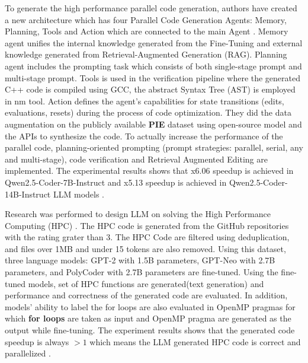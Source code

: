 \documentclass[conference]{IEEEtran}
\begin{document}
To generate the high performance parallel code generation, authors have created a new architecture which has four Parallel Code Generation Agents: Memory, Planning, Tools and Action which are connected to the main Agent  \cite{huang2025paracoder}. Memory agent unifies the internal knowledge generated from the Fine-Tuning and external knowledge generated from Retrieval-Augmented Generation (RAG). Planning agent includes the prompting task which consists of both single-stage prompt and multi-stage prompt. Tools is used in the verification pipeline where the generated C++ code is compiled using GCC, the abstract Syntax Tree (AST) is employed in nm tool. Action defines the agent's capabilities for state transitions (edits, evaluations, resets) during the process of code optimization. They did the data augmentation on the publicly available \textbf{PIE} dataset using open-source model and the APIs to synthesize the code. To actually increase the performance of the parallel code, planning-oriented prompting (prompt strategies: parallel, serial, any and multi-stage), code verification and Retrieval Augmented Editing are implemented. The experimental results shows that x6.06 speedup is achieved in Qwen2.5-Coder-7B-Instruct and x5.13 speedup is achieved in Qwen2.5-Coder-14B-Instruct LLM models \cite{huang2025paracoder}.  


Research was performed to design LLM on solving the High Performance Computing (HPC) \cite{nichols2023modeling}. The HPC code is generated from the GitHub repositories with the rating grater than 3. The HPC Code are filtered using deduplication, and files over 1MB and under 15 tokens are also removed. Using this dataset, three language models: GPT-2 with 1.5B parameters, GPT-Neo with 2.7B parameters, and PolyCoder with 2.7B parameters are fine-tuned. Using the fine-tuned models, set of HPC functions are generated(text generation) and performance and correctness of the generated code are evaluated. In addition, models' ability to label the for loops are also evaluated in OpenMP pragmas for which \textbf{for loops} are taken as input and OpenMP pragma are generated as the output while fine-tuning. The experiment results shows that the generated code speedup is always $> 1$ which means the LLM generated HPC code is correct and parallelized \cite{nichols2023modeling}. 
\end{document}
